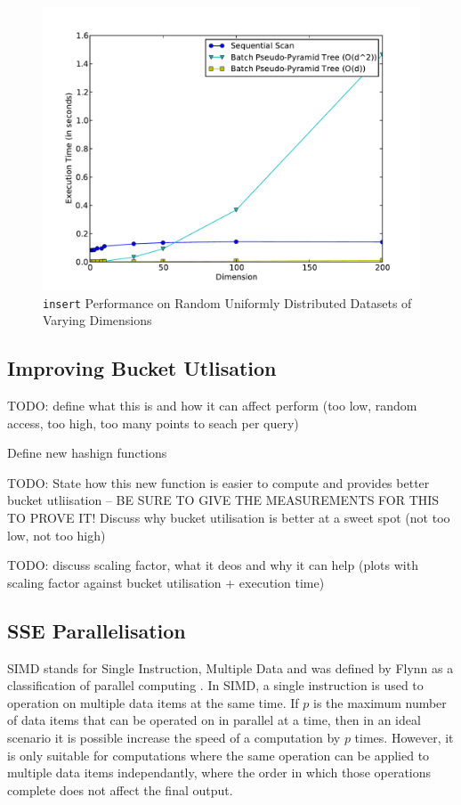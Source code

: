 \begin{figure}
	\centering
	\includegraphics[scale=0.5]{figures/performance_analysis/iteration_2/new_pseudo-pyramid_hash_performance.pdf}
	\caption{\texttt{insert} Performance on Random Uniformly Distributed Datasets of Varying Dimensions}
	\label{fig:new-pseudo-pyramid-hash}
\end{figure}

\subsection{Improving Bucket Utlisation}

TODO: define what this is and how it can affect perform (too low, random access, too high, too many points to seach per query)

Define new hashign functions

TODO: State how this new function is easier to compute and provides better bucket utliisation -- BE SURE TO GIVE THE MEASUREMENTS FOR THIS TO PROVE IT! Discuss why bucket utilisation is better at a sweet spot (not too low, not too high)

TODO: discuss scaling factor, what it deos and why it can help (plots with scaling factor against bucket utilisation + execution time)

\subsection{SSE Parallelisation}

SIMD stands for Single Instruction, Multiple Data and was defined by Flynn as a classification of parallel computing \cite{flynns-taxonomy}. In SIMD, a single instruction is used to operation on multiple data items at the same time. If $p$ is the maximum number of data items that can be operated on in parallel at a time, then in an ideal scenario it is possible increase the speed of a computation by $p$ times. However, it is only suitable for computations where the same operation can be applied to multiple data items independantly, where the order in which those operations complete does not affect the final output.

